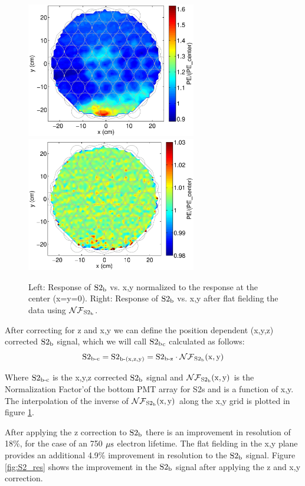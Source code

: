\begin{figure}[h!]\centering
\includegraphics[width=74mm]{Chapter_XYZ_Corr/Thesis_Corr_Plots/S2_b_1cm_1cm/S2_b_XY_1cm_norm.eps}
\includegraphics[width=74mm]{Chapter_XYZ_Corr/Thesis_Corr_Plots/S2_b_1cm_1cm/S2_b_XY_1cm_norm_FlatField.eps}
\caption{Left: Response of $\rm S2_b$ vs. x,y normalized to the response at the center (x=y=0). Right: Response of $\rm S2_b$ vs. x,y after flat fielding the data using $\rm\mathcal{NF}_{S2_b}$. }
\label{fig:S2_XY_norm_center}
\end{figure}


After correcting for z and x,y we can define the position dependent  (x,y,z) corrected $\rm S2_b$ signal, which we will call $\rm S2{_b}_c$ calculated as follows:
\begin{equation}
\rm S2_{\operatorname{b-c}}= S2_{\operatorname{b-(x,z,y)}}=S2_{\operatorname{b-z}} \cdot \mathcal{NF}_{S2_b}(x,y)
\label{eq:S2_XYZ}
\end{equation}

Where $\rm S2_{\operatorname{b-c}}$ is the x,y,z corrected $\rm S2_b$ signal and $\rm \mathcal{NF}_{S2_b}(x,y)$ is the Normalization Factor'of the bottom PMT array for S2s and is a function of x,y. The interpolation of the inverse of $\rm \mathcal{NF}_{S2_b}(x,y)$ along the x,y grid is plotted in figure \ref{fig:S2_XY_norm_center}.


After applying the z correction to $\rm S2_b$ there is an improvement in resolution of 18\%, for the case of an 750 $\rm \mu s$ electron lifetime. The flat fielding in the x,y plane provides an additional 4.9\% improvement in resolution to the $\rm S2_b$ signal. Figure \ref{fig:S2_res} shows the improvement in the $\rm S2_b$ signal after applying the z and x,y correction.

